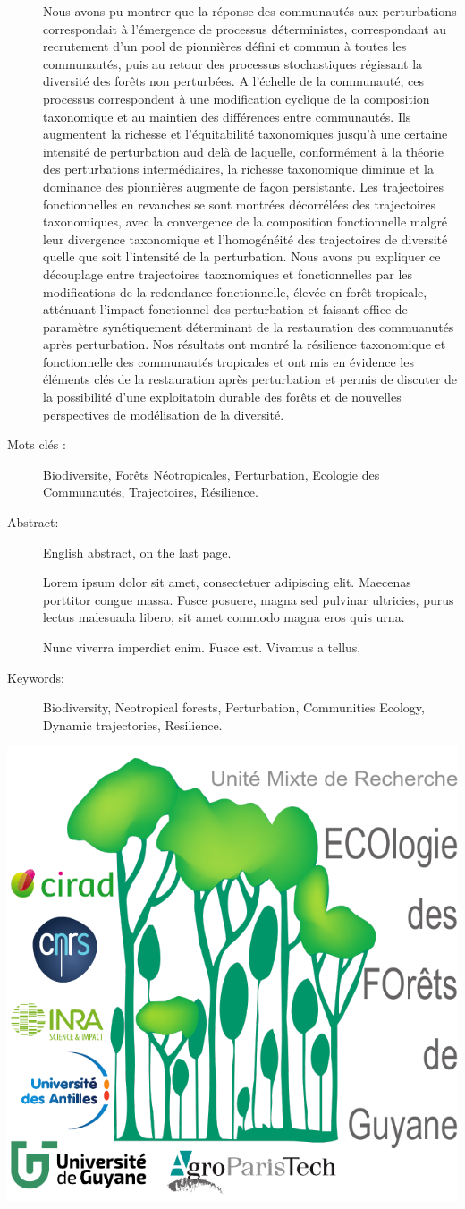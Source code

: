 \documentclass[
  11pt,
  french,
  A4paper,
  extrafontsizes,onecolumn,openright
  ]{memoir}
\begin{document}
\begin{normalsize}
\begin{description}
Nous avons pu montrer que la réponse des communautés aux perturbations
correspondait à l'émergence de processus déterministes, correspondant au
recrutement d'un pool de pionnières défini et commun à toutes les
communautés, puis au retour des processus stochastiques régissant la
diversité des forêts non perturbées. A l'échelle de la communauté, ces
processus correspondent à une modification cyclique de la composition
taxonomique et au maintien des différences entre communautés. Ils
augmentent la richesse et l'équitabilité taxonomiques jusqu'à une
certaine intensité de perturbation aud delà de laquelle, conformément à
la théorie des perturbations intermédiaires, la richesse taxonomique
diminue et la dominance des pionnières augmente de façon persistante.
Les trajectoires fonctionnelles en revanches se sont montrées
décorrélées des trajectoires taxonomiques, avec la convergence de la
composition fonctionnelle malgré leur divergence taxonomique et
l'homogénéité des trajectoires de diversité quelle que soit l'intensité
de la perturbation. Nous avons pu expliquer ce découplage entre
trajectoires taoxnomiques et fonctionnelles par les modifications de la
redondance fonctionnelle, élevée en forêt tropicale, atténuant l'impact
fonctionnel des perturbation et faisant office de paramètre
synétiquement déterminant de la restauration des commuanutés après
perturbation. Nos résultats ont montré la résilience taxonomique et
fonctionnelle des communautés tropicales et ont mis en évidence les
éléments clés de la restauration après perturbation et permis de
discuter de la possibilité d'une exploitatoin durable des forêts et de
nouvelles perspectives de modélisation de la diversité.

\item[Mots clés :]
Biodiversite, Forêts Néotropicales, Perturbation, Ecologie des Communautés, Trajectoires, Résilience.
~\\

\item[Abstract:]
English abstract, on the last page.

Lorem ipsum dolor sit amet, consectetuer adipiscing elit. Maecenas
porttitor congue massa. Fusce posuere, magna sed pulvinar ultricies,
purus lectus malesuada libero, sit amet commodo magna eros quis urna.

Nunc viverra imperdiet enim. Fusce est. Vivamus a tellus.

\item[Keywords:]
Biodiversity, Neotropical forests, Perturbation, Communities Ecology, Dynamic trajectories, Resilience.

\end{description}

\end{normalsize}

\vspace*{\fill}
\centering\includegraphics[width=.3\textwidth]{images/Logo-Lab}
\end{document}
